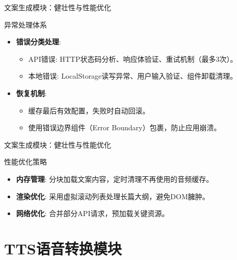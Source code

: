 \documentclass{beamer}
\begin{document}
\begin{frame}{文案生成模块：健壮性与性能优化}
    \begin{block}{异常处理体系}
        \begin{itemize}
            \item \textbf{错误分类处理}:
                  \begin{itemize}
                      \item API错误: HTTP状态码分析、响应体验证、重试机制（最多3次）。
                      \item 本地错误: LocalStorage读写异常、用户输入验证、组件卸载清理。
                  \end{itemize}
            \item \textbf{恢复机制}:
                  \begin{itemize}
                      \item 缓存最后有效配置，失败时自动回滚。
                      \item 使用错误边界组件（Error Boundary）包裹，防止应用崩溃。
                  \end{itemize}
        \end{itemize}
    \end{block}
\end{frame}



\begin{frame}{文案生成模块：健壮性与性能优化}
    \begin{block}{性能优化策略}
        \begin{itemize}
            \item \textbf{内存管理}: 分块加载文案内容，定时清理不再使用的音频缓存。
            \item \textbf{渲染优化}: 采用虚拟滚动列表处理长篇大纲，避免DOM臃肿。
            \item \textbf{网络优化}: 合并部分API请求，预加载关键资源。
        \end{itemize}
    \end{block}
\end{frame}





\section{TTS语音转换模块}
\end{document}
